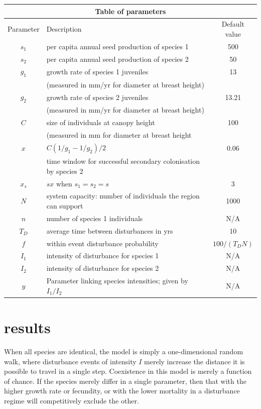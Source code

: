 \documentclass[preprint,10pt,reqno]{amsart}
\begin{document}
\begin{center}
\begin{tabular}{|c|l|c|} \hline
\multicolumn{3}{|c|}{Table of parameters} \\ \hline
Parameter & Description & Default value \\ \hline
$s_1$ & per capita annual seed production of species 1 & 500 \\ \hline
$s_2$ & per capita annual seed production of species 2 & 50\\ \hline
$g_1$&growth rate of species 1 juveniles & 13 \\
&(measured in mm/yr for diameter at breast height) &\\ \hline
$g_2$&growth rate of species 2 juveniles & 13.21 \\
&(measured in mm/yr for diameter at breast height) &\\ \hline
$C$& size of individuals at canopy height & 100 \\
& (measured in mm for diameter at breast height&\\ \hline
$x$&$C(1/g_1-1/g_2)/2$&0.06\\
&time window for successful secondary colonisation by species 2&\\ \hline
$x_s$& $s x$ when $s_1=s_2=s$&3\\ \hline
$N$ & system capacity: number of individuals the region can support & 1000 \\ \hline
$n$ & number of species 1 individuals & N/A \\ \hline
$T_D$& average time between disturbances in yrs & 10 \\ \hline
$f$& within event disturbance probability & $100/(T_D N)$ \\ \hline
$I_1$& intensity of disturbance for species 1 & N/A \\ \hline
$I_2$& intensity of disturbance for species 2 & N/A \\ \hline
$y$ &Parameter linking species intensities; given by $I_1/I_2$ & N/A \\ \hline
\end{tabular} \end{center}

\section{results}
When all species are identical, the model is simply a one-dimensional random walk, where disturbance events of intensity $I$ merely increase the distance it is possible to travel in a single step. Coexistence in this model is merely a function of chance. If the species merely differ in a single parameter, then that with the higher growth rate or fecundity, or with the lower mortality in a disturbance regime will competitively exclude the other.
\end{document}
